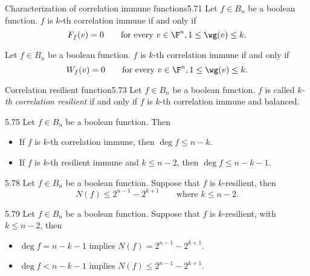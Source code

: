 \begin{teor}{Characterization of correlation immune functions}{5.71}
	Let \(f\in B_n\) be a boolean function. \(f\) is \(k\)-th correlation immune if and only if
	\[
		F_f(v) = 0 \qquad\text{for every }v \in \F^n, 1 \le \wg(v) \le k.
	\]
\end{teor}

\begin{cor}
	Let \(f\in B_n\) be a boolean function. \(f\) is \(k\)-th correlation immune if and only if
	\[
		W_f(v) = 0 \qquad\text{for every }v \in \F^n, 1 \le \wg(v) \le k.
	\]
\end{cor}

\begin{defn}{Correlation resilient function}{5.73}
	Let \(f\in B_n\) be a boolean function. \(f\) is called \emph{\(k\)-th correlation resilient} if and only if \(f\) is \(k\)-th correlation immune and balanced.
\end{defn}

\begin{teor}{}{5.75}
	Let \(f\in B_n\) be a boolean function. Then
	\begin{itemize}
		\item If \(f\) is \(k\)-th correlation immune, then \(\deg f \le n-k\).
		\item If \(f\) is \(k\)-th resilient immune and \(k\le n-2\), then \(\deg f \le n-k-1\).
	\end{itemize}
\end{teor}

\begin{teor}{}{5.78}
	Let \(f\in B_n\) be a boolean function. Suppose that \(f\) is \(k\)-resilient, then
	\[
		N(f) \le 2^{n-1}-2^{k+1} \qquad\text{where }k \le n-2.
	\]
\end{teor}

\begin{teor}{}{5.79}
	Let \(f\in B_n\) be a boolean function. Suppose that \(f\) is \(k\)-resilient, with \(k\le n-2\), then
	\begin{itemize}
		\item \(\deg f = n-k-1\) implies \(N(f) = 2^{n-1}-2^{k+1}\).
		\item \(\deg f < n-k-1\) implies \(N(f) \le 2^{n-1}-2^{k+1}\).
	\end{itemize}
\end{teor}